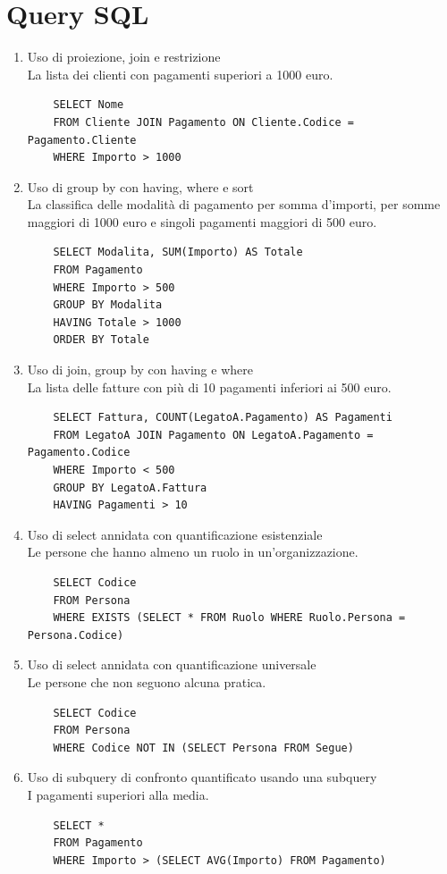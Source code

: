 \documentclass[10pt]{article}
\begin{document}
\section{Query SQL}
\begin{enumerate}
	\item Uso di proiezione, join e restrizione\\
	La lista dei clienti con pagamenti superiori a 1000 euro.
	\begin{lstlisting}
	SELECT Nome
	FROM Cliente JOIN Pagamento ON Cliente.Codice = Pagamento.Cliente
	WHERE Importo > 1000
	\end{lstlisting}
	\item Uso di group by con having, where e sort\\
	La classifica delle modalità di pagamento per somma d'importi, per somme maggiori di 1000 euro e singoli pagamenti maggiori di 500 euro.
	\begin{lstlisting}
	SELECT Modalita, SUM(Importo) AS Totale
	FROM Pagamento
	WHERE Importo > 500
	GROUP BY Modalita
	HAVING Totale > 1000
	ORDER BY Totale
	\end{lstlisting}
	\item Uso di join, group by con having e where\\
	La lista delle fatture con più di 10 pagamenti inferiori ai 500 euro.
	\begin{lstlisting}
	SELECT Fattura, COUNT(LegatoA.Pagamento) AS Pagamenti
	FROM LegatoA JOIN Pagamento ON LegatoA.Pagamento = Pagamento.Codice
	WHERE Importo < 500
	GROUP BY LegatoA.Fattura
	HAVING Pagamenti > 10
	\end{lstlisting}
	\item Uso di select annidata con quantificazione esistenziale\\
	Le persone che hanno almeno un ruolo in un'organizzazione.
	\begin{lstlisting}
	SELECT Codice
	FROM Persona
	WHERE EXISTS (SELECT * FROM Ruolo WHERE Ruolo.Persona = Persona.Codice)
	\end{lstlisting}
	\item Uso di select annidata con quantificazione universale\\
	Le persone che non seguono alcuna pratica.
	\begin{lstlisting}
	SELECT Codice
	FROM Persona
	WHERE Codice NOT IN (SELECT Persona FROM Segue)
	\end{lstlisting}
	\item Uso di subquery di confronto quantificato usando una subquery\\
	I pagamenti superiori alla media.
	\begin{lstlisting}
	SELECT *
	FROM Pagamento
	WHERE Importo > (SELECT AVG(Importo) FROM Pagamento)
	\end{lstlisting}
\end{enumerate}
\pagebreak
\end{document}
